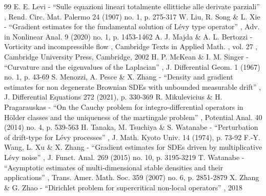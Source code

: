 \documentclass[11pt]{article}
\numberwithin{equation}{section}\providecommand{\asymp}{\mathrel{\sim}}
\theoremstyle{plain}
\theoremstyle{definition}
\newcommand\1{{\mathbf{1}}}
\begin{document}
\begin{thebibliography}{99}
 E. E. Levi - “Sulle equazioni lineari totalmente ellittiche alle derivate parziali” , Rend. Circ. Mat. Palermo 24 (1907) no. 1, p. 275-317
 W. Liu, R. Song \& L. Xie - “Gradient estimates for the fundamental solution of Lévy type operator” , Adv. in Nonlinear Anal. 9 (2020) no. 1, p. 1453-1462
 A. J. Majda \& A. L. Bertozzi - Vorticity and incompressible flow , Cambridge Texts in Applied Math. , vol. 27 , Cambridge University Press, Cambridge, 2002
 H. P. McKean \& I. M. Singer - “Curvature and the eigenvalues of the Laplacian” , J. Differential Geom. 1 (1967) no. 1, p. 43-69
 S. Menozzi, A. Pesce \& X. Zhang - “Density and gradient estimates for non degenerate Brownian SDEs with unbounded measurable drift” , J. Differential Equations 272 (2021), p. 330-369
 R. Mikulevicius \& H. Pragarauskas - “On the Cauchy problem for integro-differential operators in Hölder classes and the uniqueness of the martingale problem” , Potential Anal. 40 (2014) no. 4, p. 539-563
 H. Tanaka, M. Tsuchiya \& S. Watanabe - “Perturbation of drift-type for Lévy processes” , J. Math. Kyoto Univ. 14 (1974), p. 73-92
 F.-Y. Wang, L. Xu \& X. Zhang - “Gradient estimates for SDEs driven by multiplicative Lévy noise” , J. Funct. Anal. 269 (2015) no. 10, p. 3195-3219
 T. Watanabe - “Asymptotic estimates of multi-dimensional stable densities and their applications” , Trans. Amer. Math. Soc. 359 (2007) no. 6, p. 2851-2879
 X. Zhang \& G. Zhao - “Dirichlet problem for supercritical non-local operators” , 2018
\end{thebibliography}
\end{document}
